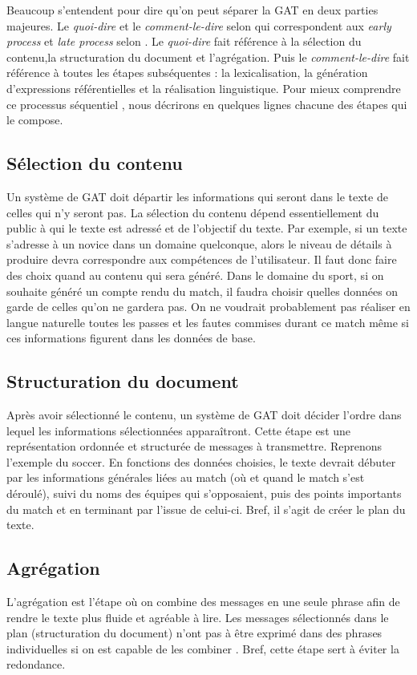 Beaucoup s'entendent pour dire qu'on peut séparer la \ac{GAT} en deux parties majeures. Le \emph{quoi-dire} et le \emph{comment-le-dire} selon \citep{DanlosPresentationmodelegeneration1983} qui correspondent aux \emph{early process} et \emph{late process} selon \cite{gatt18}. Le \emph{quoi-dire} fait référence à la sélection du contenu,la structuration du document et l'agrégation. Puis le \emph{comment-le-dire} fait référence à toutes les étapes subséquentes : la lexicalisation, la génération d'expressions référentielles et la réalisation linguistique. Pour mieux comprendre ce processus séquentiel , nous décrirons en quelques lignes chacune des étapes qui le compose.

\subsection{Sélection du contenu}
Un système de \ac{GAT} doit départir les informations qui seront dans le texte de celles qui n'y seront pas. La sélection du contenu dépend essentiellement du public à qui le texte est adressé et de l'objectif du texte. Par exemple, si un texte s'adresse à un novice dans un domaine quelconque, alors le niveau de détails à produire devra correspondre aux compétences de l'utilisateur. Il faut donc faire des choix quand au contenu qui sera généré. Dans le domaine du sport, si on souhaite généré un compte rendu du match, il faudra choisir quelles données on garde de celles qu'on ne gardera pas. On ne voudrait probablement pas réaliser en langue naturelle toutes les passes et les fautes commises durant ce match même si ces informations figurent dans les données de base.

\subsection{Structuration du document}
Après avoir sélectionné le contenu, un système de \ac{GAT} doit décider l'ordre dans lequel les informations sélectionnées apparaîtront. Cette étape est une représentation ordonnée et structurée de messages à transmettre.  Reprenons l'exemple du soccer. En fonctions des données choisies, le texte devrait débuter par les informations générales liées au match (où et quand le match s'est déroulé), suivi du noms des équipes qui s'opposaient, puis des points importants du match et en terminant par l'issue de celui-ci. Bref, il s'agit de créer le plan du texte. 

\subsection{Agrégation}
L'agrégation est l'étape où on combine des messages en une seule phrase afin de rendre le texte plus fluide et agréable à lire. Les messages sélectionnés dans le plan (structuration du document) n'ont pas à être exprimé dans des phrases individuelles si on est capable de les combiner \citep{ChengCapturingInteractionAggregation2000}. Bref, cette étape sert à éviter la redondance.

